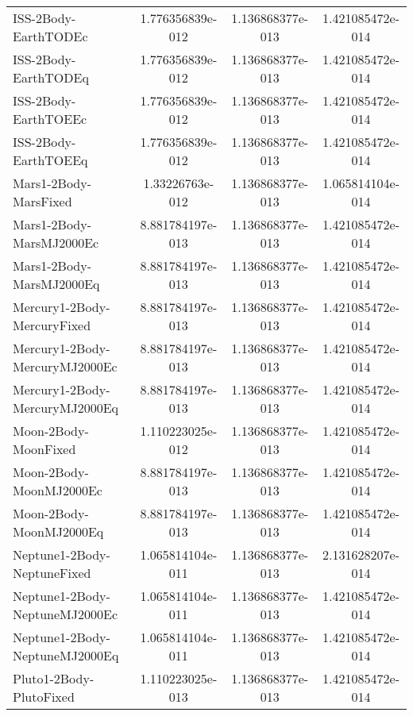 \begin{table}[htbp!]
\begin{tabular}{lccc}
         ISS-2Body-EarthTODEc & 1.776356839e-012 & 1.136868377e-013 & 1.421085472e-014 \\
         ISS-2Body-EarthTODEq & 1.776356839e-012 & 1.136868377e-013 & 1.421085472e-014 \\
         ISS-2Body-EarthTOEEc & 1.776356839e-012 & 1.136868377e-013 & 1.421085472e-014 \\
         ISS-2Body-EarthTOEEq & 1.776356839e-012 & 1.136868377e-013 & 1.421085472e-014 \\
         Mars1-2Body-MarsFixed & 1.33226763e-012 & 1.136868377e-013 & 1.065814104e-014 \\
         Mars1-2Body-MarsMJ2000Ec & 8.881784197e-013 & 1.136868377e-013 & 1.421085472e-014 \\
         Mars1-2Body-MarsMJ2000Eq & 8.881784197e-013 & 1.136868377e-013 & 1.421085472e-014 \\
         Mercury1-2Body-MercuryFixed & 8.881784197e-013 & 1.136868377e-013 & 1.421085472e-014 \\
         Mercury1-2Body-MercuryMJ2000Ec & 8.881784197e-013 & 1.136868377e-013 & 1.421085472e-014 \\
         Mercury1-2Body-MercuryMJ2000Eq & 8.881784197e-013 & 1.136868377e-013 & 1.421085472e-014 \\
         Moon-2Body-MoonFixed & 1.110223025e-012 & 1.136868377e-013 & 1.421085472e-014 \\
         Moon-2Body-MoonMJ2000Ec & 8.881784197e-013 & 1.136868377e-013 & 1.421085472e-014 \\
         Moon-2Body-MoonMJ2000Eq & 8.881784197e-013 & 1.136868377e-013 & 1.421085472e-014 \\
         Neptune1-2Body-NeptuneFixed & 1.065814104e-011 & 1.136868377e-013 & 2.131628207e-014 \\
         Neptune1-2Body-NeptuneMJ2000Ec & 1.065814104e-011 & 1.136868377e-013 & 1.421085472e-014 \\
         Neptune1-2Body-NeptuneMJ2000Eq & 1.065814104e-011 & 1.136868377e-013 & 1.421085472e-014 \\
         Pluto1-2Body-PlutoFixed & 1.110223025e-013 & 1.136868377e-013 & 1.421085472e-014 \\

\end{tabular}
\end{table}
